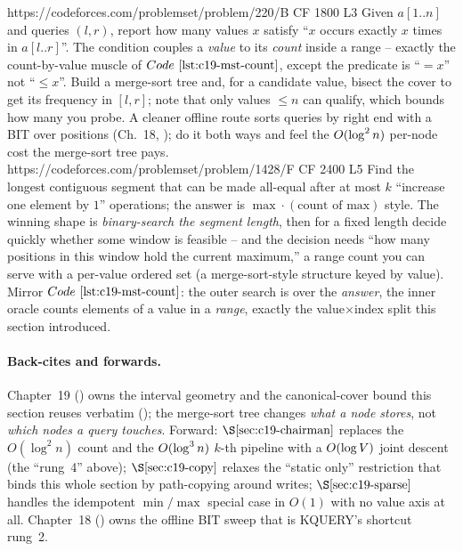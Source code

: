 \begin{practiceset}
    {https://codeforces.com/problemset/problem/220/B}
    {CF 1800 L3}
    {Given \(a[1..n]\) and queries \((l,r)\), report how many values \(x\) satisfy ``\(x\) occurs exactly \(x\) times in \(a[l..r]\)''.  The condition couples a \emph{value} to its \emph{count} inside a range -- exactly the count-by-value muscle of \(\coderef{c19-mst-count}\), except the predicate is ``\(=x\)'' not ``\(\le x\)''.  Build a merge-sort tree and, for a candidate value, bisect the cover to get its frequency in \([l,r]\); note that only values \(\le n\) can qualify, which bounds how many you probe.  A cleaner offline route sorts queries by right end with a BIT over positions (Ch.~18, ); do it both ways and feel the \(O(\log^2 n)\) per-node cost the merge-sort tree pays.}
    {https://codeforces.com/problemset/problem/1428/F}
    {CF 2400 L5}
    {Find the longest contiguous segment that can be made all-equal after at most \(k\) ``increase one element by \(1\)'' operations; the answer is \(\max\cdot(\text{count of max})\) style.  The winning shape is \emph{binary-search the segment length}, then for a fixed length decide quickly whether some window is feasible -- and the decision needs ``how many positions in this window hold the current maximum,'' a range count you can serve with a per-value ordered set (a merge-sort-style structure keyed by value).  Mirror \(\coderef{c19-mst-count}\): the outer search is over the \emph{answer}, the inner oracle counts elements of a value in a \emph{range}, exactly the value\(\times\)index split this section introduced.}
\end{practiceset}

\paragraph{Back-cites and forwards.}
Chapter~19 () owns the interval geometry and the canonical-cover bound this section reuses verbatim (); the merge-sort tree changes \emph{what a node stores}, not \emph{which nodes a query touches}.  Forward: \(\secref{c19-chairman}\) replaces the \(O(\log^2 n)\) count and the \(O(\log^3 n)\) \(k\)-th pipeline with a \(O(\log V)\) joint descent (the ``rung~4'' above); \(\secref{c19-copy}\) relaxes the ``static only'' restriction that binds this whole section by path-copying around writes; \(\secref{c19-sparse}\) handles the idempotent \(\min/\max\) special case in \(O(1)\) with no value axis at all.  Chapter~18 () owns the offline BIT sweep that is KQUERY's shortcut rung~2.

